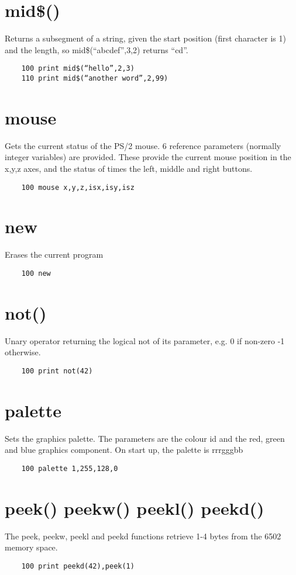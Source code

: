 \section*{mid\$()}
Returns a subsegment of a string, given the start position (first character is 1) and the length, so mid\$(“abcdef”,3,2) returns “cd”. 
\example{}
\begin{verbatim}
	100 print mid$(“hello”,2,3)
	110 print mid$(“another word”,2,99)
\end{verbatim}

\section*{mouse}
Gets the current status of the PS/2 mouse. 6 reference parameters (normally integer variables) are provided. These provide the current mouse position in the x,y,z axes, and the status of times the left, middle and right buttons.
\example{}
\begin{verbatim}
	100 mouse x,y,z,isx,isy,isz
\end{verbatim}

\section*{new}
Erases the current program
\example{}
\begin{verbatim}
	100 new
\end{verbatim}

\section*{not()}
Unary operator returning the logical not of its parameter, e.g. 0 if non-zero -1 otherwise.
\example{}
\begin{verbatim}
	100 print not(42)
\end{verbatim}

\section*{palette}
Sets the graphics palette. The parameters are the colour id and the red, green and blue graphics component. On start up, the palette is rrrgggbb
\example{}
\begin{verbatim}
	100 palette 1,255,128,0
\end{verbatim}

\section*{peek() peekw() peekl() peekd() }
The peek, peekw, peekl and peekd functions retrieve 1-4 bytes from the 6502 memory space.
\example{}
\begin{verbatim}
	100 print peekd(42),peek(1)
\end{verbatim}

